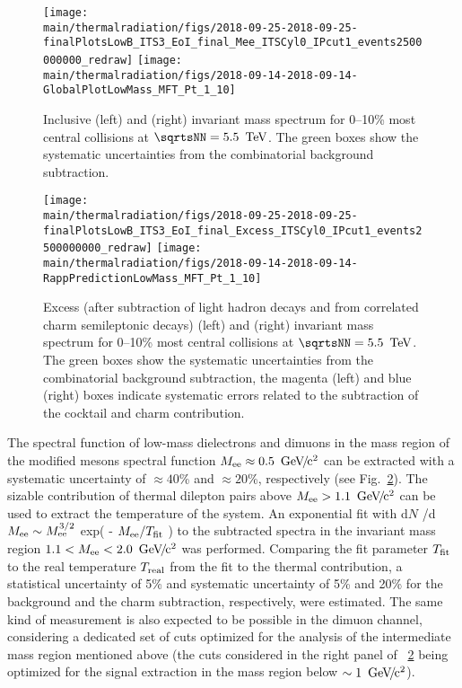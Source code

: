 \documentclass[../report.tex]{subfiles}
\providecommand{\main}{..}
\begin{document}
\begin{figure}[htb]
\centering
\texttt{[image: \\main/thermalradiation/figs/2018-09-25-2018-09-25-finalPlotsLowB\_ITS3\_EoI\_final\_Mee\_ITSCyl0\_IPcut1\_events2500000000\_redraw]}
\texttt{[image: \\main/thermalradiation/figs/2018-09-14-2018-09-14-GlobalPlotLowMass\_MFT\_Pt\_1\_10]}
\caption{Inclusive \Pepem (left) and \PGmpGmm (right) invariant mass spectrum for 0--10\% most central \PbPb{} collisions at $\sqrtsNN = \unit[5.5]{\UTeV}$. The green boxes show the systematic uncertainties from the combinatorial background subtraction.}
\label{fig:DileptonsSpectra}
\end{figure}

\begin{figure}[htb]
\centering
\texttt{[image: \\main/thermalradiation/figs/2018-09-25-2018-09-25-finalPlotsLowB\_ITS3\_EoI\_final\_Excess\_ITSCyl0\_IPcut1\_events2500000000\_redraw]}
\texttt{[image: \\main/thermalradiation/figs/2018-09-14-2018-09-14-RappPredictionLowMass\_MFT\_Pt\_1\_10]}
\caption{Excess (after subtraction of light hadron decays and from correlated charm semileptonic decays) \Pepem (left) and \PGmpGmm (right) invariant mass spectrum for 0--10\% most central \PbPb{} collisions at $\sqrtsNN = \unit[5.5]{\UTeV}$. The green boxes show the systematic uncertainties from the combinatorial background subtraction, the magenta (left) and blue (right) boxes indicate systematic errors related to the subtraction of the cocktail and charm contribution.}
\label{fig:DileptonsSpectraSubtracted}
\end{figure}

The spectral function of low-mass dielectrons and dimuons in the mass region of the modified \PGr mesons spectral function $M_{\rm ee}\approx\unit[0.5]{\UGeVcc}$ can be extracted with a systematic uncertainty of $\approx 40$\% and $\approx 20$\%, respectively (see Fig.~\ref{fig:DileptonsSpectraSubtracted}). 
The sizable contribution of thermal dilepton pairs above $M_{\rm ee}>\unit[1.1]{\UGeVcc}$ can be used to extract the temperature of the system. An exponential fit with d$N$ /d$M_{\rm ee} \sim  M_{\rm ee}^{3/2}$ exp( - $M_{\rm ee} /T_{\rm fit}$ ) to the subtracted \Pepem spectra in the invariant mass region $1.1 < M_{\rm ee} < \unit[2.0]{\UGeVcc}$ was performed. Comparing the fit parameter $T_{\rm fit}$ to the real temperature $T_{\rm real}$ from the fit to the thermal contribution, a statistical uncertainty of 5\% and systematic uncertainty of 5\% and 20\% for the background and the charm subtraction, respectively, were estimated. The same kind of measurement is also expected to be possible in the dimuon channel, considering a dedicated set of cuts optimized for the analysis of the intermediate mass region mentioned above (the cuts considered in the right panel of \figurename~\ref{fig:DileptonsSpectraSubtracted} being optimized for the signal extraction in the mass region below $\sim \unit[1]{\UGeVcc}$).
\end{document}
